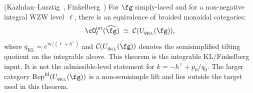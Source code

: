 \begin{theorem}
\label{thm:kl-equivalence}
\textup{(}Kazhdan--Lusztig~\cite{KL93}, Finkelberg~\cite{Finkelberg96}\textup{)}\quad
For $\fg$ simply-laced and for a non-negative integral WZW
level~$\ell$, there is an equivalence of braided monoidal categories:
\begin{equation}\label{eq:kl-equivalence-dl}
\cO_\ell^{\mathrm{int}}(\widehat{\fg})
\;\simeq\;
\mathcal{C}(U_{q_{\mathrm{KL}}}(\fg)),
\end{equation}
where $q_{\mathrm{KL}} = e^{\pi i/(\ell+h^\vee)}$ and
$\mathcal{C}(U_{q_{\mathrm{KL}}}(\fg))$ denotes the semisimplified
tilting quotient on the integrable alcove.
This theorem is the integrable KL/Finkelberg input. It is not the
admissible-level statement for $k=-h^\vee+p_0/q_0$. The larger category
$\mathrm{Rep}^{\mathrm{fd}}(U_{q_{\mathrm{KL}}}(\fg))$ is a
non-semisimple lift and lies outside the target used in this theorem.
\end{theorem}

